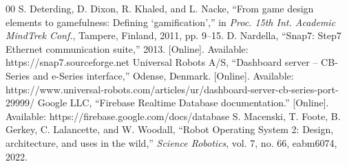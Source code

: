\documentclass[conference]{IEEEtran}
\begin{document}
\begin{thebibliography}{00}
 S. Deterding, D. Dixon, R. Khaled, and L. Nacke, ``From game design elements to gamefulness: Defining `gamification','' in \emph{Proc. 15th Int. Academic MindTrek Conf.}, Tampere, Finland, 2011, pp. 9--15.
 D. Nardella, ``Snap7: Step7 Ethernet communication suite,'' 2013. [Online]. Available: https://snap7.sourceforge.net
 Universal Robots A/S, ``Dashboard server -- CB-Series and e-Series interface,'' Odense, Denmark. [Online]. Available: https://www.universal-robots.com/articles/ur/dashboard-server-cb-series-port-29999/
 Google LLC, ``Firebase Realtime Database documentation.'' [Online]. Available: https://firebase.google.com/docs/database
 S. Macenski, T. Foote, B. Gerkey, C. Lalancette, and W. Woodall, ``Robot Operating System 2: Design, architecture, and uses in the wild,'' \emph{Science Robotics}, vol. 7, no. 66, eabm6074, 2022.
\end{thebibliography}
\end{document}

